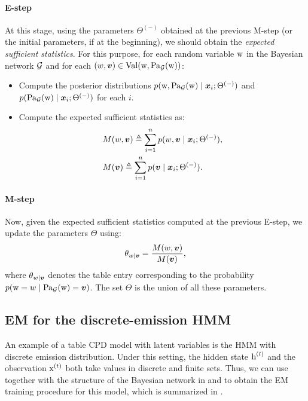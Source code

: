 \paragraph{E-step} At this stage, using the parameters $\Theta^{(-)}$ obtained at the previous M-step (or the initial parameters, if at the beginning), we should obtain the \emph{expected sufficient statistics}. For this purpose, for each random variable ${\textnormal{w}}$ in the Bayesian network ${\mathcal{G}}$ and for each $(w,{\bm{v}}) \in \mathrm{Val}({\textnormal{w}},\mathrm{Pa}_{\mathcal{G}}({\textnormal{w}}))$:
\begin{itemize}
    \item Compute the posterior distributions $p({\textnormal{w}},\mathrm{Pa}_{\mathcal{G}}({\textnormal{w}}) \mid {\bm{x}}_i; \Theta^{(-)})$ and $p(\mathrm{Pa}_{\mathcal{G}}({\textnormal{w}}) \mid {\bm{x}}_i; \Theta^{(-)})$ for each $i$.
    \item Compute the expected sufficient statistics as:
     \begin{align}
         &M(w,{\bm{v}}) \triangleq \sum_{i=1}^n p(w,{\bm{v}} \mid {\bm{x}}_i; \Theta^{(-)}), \label{eq:joint_suf_stat}\\
         &M({\bm{v}}) \triangleq \sum_{i=1}^n p({\bm{v}} \mid {\bm{x}}_i; \Theta^{(-)}). \label{eq:marginal_suf_stat}
     \end{align}
\end{itemize}

\paragraph{M-step} Now, given the expected sufficient statistics computed at the previous E-step, we update the parameters $\Theta$ using:
\begin{equation}
    \theta_{w \mid {\bm{v}}} = \frac{M(w,{\bm{v}})}{M({\bm{v}})},
\end{equation}
where $\theta_{w \mid {\bm{v}}}$ denotes the table entry corresponding to the probability $p({\textnormal{w}}=w \mid \mathrm{Pa}_{\mathcal{G}}({\textnormal{w}})={\bm{v}})$. The set $\Theta$ is the union of all these parameters.

\subsection{EM for the discrete-emission HMM}
\label{sec:em_hmm}
An example of a table CPD model with latent variables is the HMM with discrete emission distribution. Under this setting, the hidden state ${\textnormal{h}}^{(t)}$ and the observation ${\textnormal{x}}^{(t)}$ both take values in discrete and finite sets. Thus, we can use  together with the structure of the Bayesian network in  and  to obtain the EM training procedure for this model, which is summarized in .

